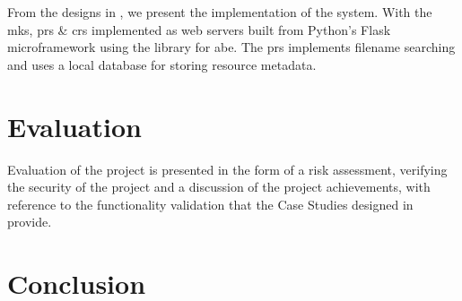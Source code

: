\documentclass[british,table,svgnames,xcdraw]{l4proj}
\begin{document}
From the designs in , we present the implementation of the \theResServer system. With the \acrfull{mks}, \acrfull{prs} \& \acrfull{crs} implemented as web servers built from Python's Flask microframework using the \PyOpenABE library for \acrfull{abe}. The \acrshort{prs} implements filename searching and uses a local database for storing resource metadata.











\chapter{Evaluation}
\label{ch:evaluation}

Evaluation of the project is presented in the form of a risk assessment, verifying the security of the project and a discussion of the project achievements, with reference to the functionality validation that the Case Studies designed in  provide.







\chapter{Conclusion}
\label{ch:conclusion}



%
%









\newpage

\printnoidxglossaries
\end{document}
